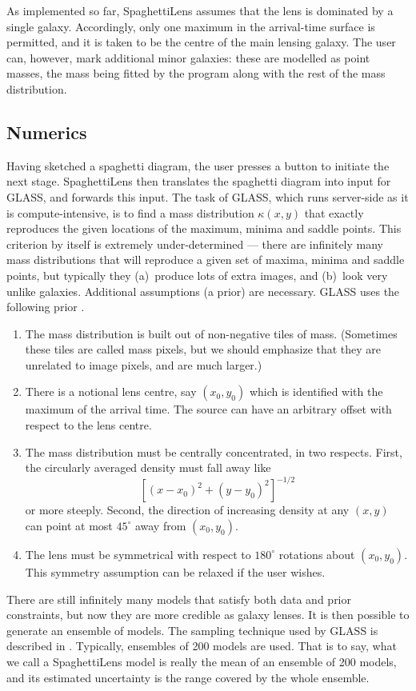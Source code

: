 \documentclass[usenatbib]{mn2e}
\newcommand{\spl}{SpaghettiLens\xspace}
\begin{document}
As implemented so far, \spl assumes that the lens is dominated by a
single galaxy.  Accordingly, only one maximum in the arrival-time surface
is permitted, and it is taken to be the centre of the main lensing
galaxy.  The user can, however, mark additional minor galaxies: these
are modelled as point masses, the mass being fitted by the program along
with the rest of the mass distribution.


\subsection{Numerics}

Having sketched a spaghetti diagram, the user presses a button to
initiate the next stage.  \spl then translates the spaghetti diagram
into input for GLASS, and forwards this input.  The task of GLASS,
which runs server-side as it is compute-intensive, is to find a mass
distribution $\kappa(x,y)$ that exactly reproduces the given locations
of the maximum, minima and saddle points. This criterion by itself is
extremely under-determined --- there are infinitely many mass
distributions that will reproduce a given set of maxima, minima and
saddle points, but typically they (a)~produce lots of extra images,
and (b)~look very unlike galaxies.  Additional assumptions (a prior)
are necessary.  GLASS uses the following prior
\citep[cf.][]{1997MNRAS.292..148S,2008ApJ...679...17C}.
\begin{enumerate}
\item The mass distribution is built out of non-negative tiles of
  mass.  (Sometimes these tiles are called mass pixels, but we should
  emphasize that they are unrelated to image pixels, and are much
  larger.)
\item There is a notional lens centre, say $(x_0,y_0)$ which is
  identified with the maximum of the arrival time.  The source can
  have an arbitrary offset with respect to the lens centre.
\item The mass distribution must be centrally concentrated, in two
  respects.  First, the circularly averaged density must fall away
  like $$ \left[(x-x_0)^2+(y-y_0)^2\right]^{-1/2}$$ or more steeply.
  Second, the direction of increasing density at any $(x,y)$ can point
  at most $45^\circ$ away from $(x_0,y_0)$.
\item The lens must be symmetrical with respect to $180^\circ$ rotations
  about $(x_0,y_0)$.  This symmetry assumption can be relaxed if the
  user wishes.
\end{enumerate}
There are still infinitely many models that satisfy both data and
prior constraints, but now they are more credible as galaxy lenses.
It is then possible to generate an ensemble of models.  The sampling
technique used by GLASS is described in \citep{Lubini2012}.
Typically, ensembles of 200 models are used.  That is to say, what we
call a \spl model is really the mean of an ensemble of 200 models, and
its estimated uncertainty is the range covered by the whole ensemble.
\end{document}
